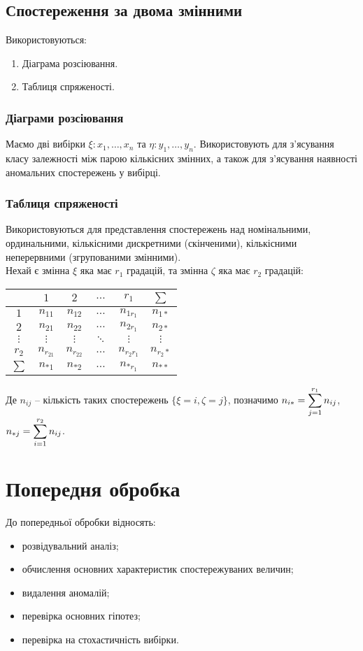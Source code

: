 \subsection{Спостереження за двома змінними}
Використовуються:
\begin{enumerate}
	\item Діаграма розсіювання.
	\item Таблиця спряженості.
\end{enumerate}
\subsubsection{Діаграми розсіювання}
Маємо дві вибірки $\xi: x_1, \ldots, x_n$ та $\eta: y_1, \ldots, y_n$. Використовують для з'ясування класу залежності між парою кількісних змінних, а також для з'ясування наявності аномальних спостережень у вибірці. %
\subsubsection{Таблиця спряженості}
Використовуються для представлення спостережень над номінальними, ординальними, кількісними дискретними (скінченими), кількісними неперервними (згрупованими змінними). \\

Нехай є змінна $\xi$ яка має $r_1$ градацій, та змінна $\zeta$ яка має $r_2$ градацій:
\begin{table}[H]
	\centering
	\begin{tabular}{|c|c|c|c|c|c|}
	\hline
	& $1$ & $2$ & $\ldots$ & $r_1$ & $\sum$ \\
 \hline
	$1$ & $n_{11}$ & $n_{12}$ & $\ldots$ & $n_{1r_1}$ & $n_{1*}$ \\
 \hline
	$2$ & $n_{21}$ & $n_{22}$ & $\ldots$ & $n_{2r_1}$ & $n_{2*}$ \\
 \hline
	$\vdots$ & $\vdots$ & $\vdots$ & $\ddots$ & $\vdots$ & $\vdots$ \\
 \hline
	$r_2$ & $n_{r_21}$ & $n_{r_22}$ & $\ldots$ & $n_{r_2r_1}$ & $n_{r_2*}$ \\
 \hline
	$\sum$ & $n_{*1}$ & $n_{*2}$ & $\ldots$ & $n_{*r_1}$ & $n_{**}$ \\
 \hline
	\end{tabular}
\end{table}
Де $n_{ij}$ -- кількість таких спостережень $\{\xi=i,\zeta=j\}$, позначимо $n_{i*} = \displaystyle\sum\limits_{j=1}^{r_1} n_{ij}$, $n_{*j} = \displaystyle\sum\limits_{i=1}^{r_2} n_{ij}$. 
\section{Попередня обробка}
До попередньої обробки відносять:
\begin{itemize}
	\item розвідувальний аналіз;
	\item обчислення основних характеристик спостережуваних величин;
	\item видалення аномалій;
	\item перевірка основних гіпотез;
	\item перевірка на стохастичність вибірки.
\end{itemize}
